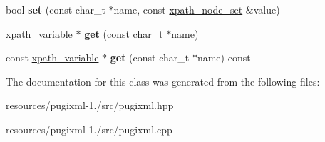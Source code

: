 \begin{DoxyCompactItemize}
\item 
\hypertarget{classpugi_1_1xpath__variable__set_a5835902a2662631836cc6457709b84ec}{bool {\bfseries set} (const char\+\_\+t $\ast$name, const \hyperlink{classpugi_1_1xpath__node__set}{xpath\+\_\+node\+\_\+set} \&value)}\label{classpugi_1_1xpath__variable__set_a5835902a2662631836cc6457709b84ec}

\item 
\hypertarget{classpugi_1_1xpath__variable__set_aca5af5d65cdf0f639890cc1d3caec610}{\hyperlink{classpugi_1_1xpath__variable}{xpath\+\_\+variable} $\ast$ {\bfseries get} (const char\+\_\+t $\ast$name)}\label{classpugi_1_1xpath__variable__set_aca5af5d65cdf0f639890cc1d3caec610}

\item 
\hypertarget{classpugi_1_1xpath__variable__set_a6a15d76060162ae19f7c175af0c15cc3}{const \hyperlink{classpugi_1_1xpath__variable}{xpath\+\_\+variable} $\ast$ {\bfseries get} (const char\+\_\+t $\ast$name) const }\label{classpugi_1_1xpath__variable__set_a6a15d76060162ae19f7c175af0c15cc3}

\end{DoxyCompactItemize}


The documentation for this class was generated from the following files\+:\begin{DoxyCompactItemize}
\item 
resources/pugixml-\/1./src/pugixml.\+hpp\item 
resources/pugixml-\/1./src/pugixml.\+cpp\end{DoxyCompactItemize}

